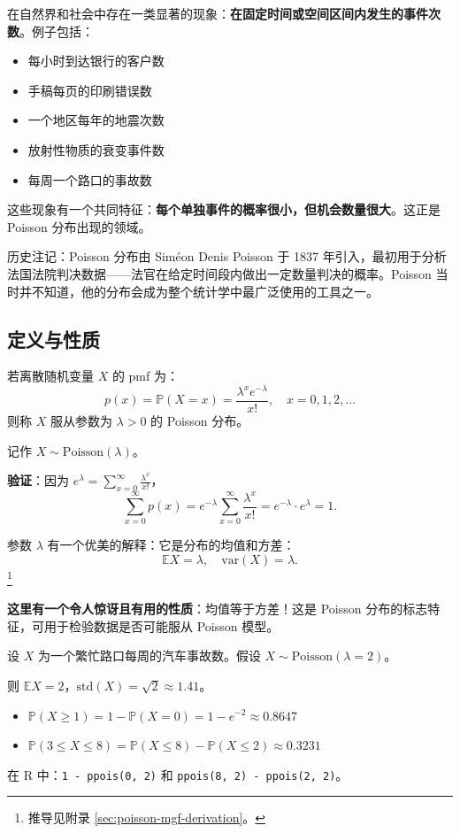 在自然界和社会中存在一类显著的现象：\textbf{在固定时间或空间区间内发生的事件次数}。例子包括：
\begin{itemize}
\item 每小时到达银行的客户数
\item 手稿每页的印刷错误数
\item 一个地区每年的地震次数
\item 放射性物质的衰变事件数
\item 每周一个路口的事故数
\end{itemize}

这些现象有一个共同特征：\textbf{每个单独事件的概率很小，但机会数量很大}。这正是 Poisson 分布出现的领域。

历史注记：Poisson 分布由 Siméon Denis Poisson 于 1837 年引入，最初用于分析法国法院判决数据——法官在给定时间段内做出一定数量判决的概率。Poisson 当时并不知道，他的分布会成为整个统计学中最广泛使用的工具之一。

\subsection{定义与性质}\label{sub:poisson-definition-ch3}

若离散随机变量 $X$ 的 pmf 为：
\begin{equation}\label{eq:poisson-pmf-ch3}
p(x) = \mathbb{P}(X=x) = \frac{\lambda^{x} e^{-\lambda}}{x!}, \quad x = 0, 1, 2, \ldots
\end{equation}
则称 $X$ 服从参数为 $\lambda > 0$ 的 Poisson 分布。

记作 $X \sim \text{Poisson}(\lambda)$。

\textbf{验证}：因为 $e^{\lambda} = \sum_{x=0}^{\infty} \frac{\lambda^{x}}{x!}$，
\[
\sum_{x=0}^{\infty} p(x) = e^{-\lambda} \sum_{x=0}^{\infty} \frac{\lambda^{x}}{x!} = e^{-\lambda} \cdot e^{\lambda} = 1.
\label{eq:poisson-normalization-ch3}
\]

参数 $\lambda$ 有一个优美的解释：它是分布的均值和方差：
\begin{equation}\label{eq:poisson-moments-ch3}
\mathbb{E}X = \lambda, \quad \text{var}(X) = \lambda.
\end{equation}\footnote{推导见附录 \cref{sec:poisson-mgf-derivation}。}

\textbf{这里有一个令人惊讶且有用的性质}：均值等于方差！这是 Poisson 分布的标志特征，可用于检验数据是否可能服从 Poisson 模型。

\begin{example}[汽车事故]\label{ex:poisson-accidents-ch3}
设 $X$ 为一个繁忙路口每周的汽车事故数。假设 $X \sim \text{Poisson}(\lambda = 2)$。

则 $\mathbb{E}X = 2$，$\text{std}(X) = \sqrt{2} \approx 1.41$。

\begin{itemize}
\item $\mathbb{P}(X \geq 1) = 1 - \mathbb{P}(X = 0) = 1 - e^{-2} \approx 0.8647$
\item $\mathbb{P}(3 \leq X \leq 8) = \mathbb{P}(X \leq 8) - \mathbb{P}(X \leq 2) \approx 0.3231$
\end{itemize}

在 R 中：\texttt{1 - ppois(0, 2)} 和 \texttt{ppois(8, 2) - ppois(2, 2)}。
\end{example}

